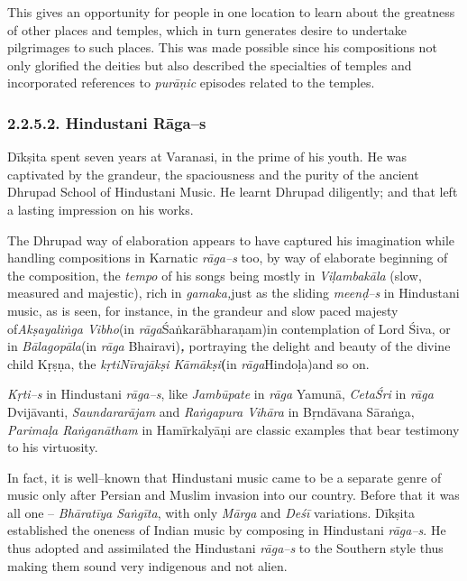 This gives an opportunity for people in one location to learn about the greatness of other places and temples, which in turn generates desire to undertake pilgrimages to such places. This was made possible since his compositions not only glorified the deities but also described the specialties of temples and incorporated references to \textit{purāṇic} episodes related to the temples.


\subsubsection*{2.2.5.2. Hindustani Rāga–s}

Dīkṣita spent seven years at Varanasi, in the prime of his youth. He was captivated by the grandeur, the spaciousness and the purity of the ancient Dhrupad School of Hindustani Music. He learnt Dhrupad diligently; and that left a lasting impression on his works.

The Dhrupad way of elaboration appears to have captured his imagination while handling compositions in Karnatic \textit{rāga–s} too, by way of elaborate beginning of the composition, the \textit{tempo} of his songs being mostly in \textit{Viḷambakāla} (slow, measured and majestic), rich in \textit{gamaka,}just as the sliding \textit{meenḍ–s} in Hindustani music, as is seen, for instance, in the grandeur and slow paced majesty of\textit{Akṣayaliṅga Vibho}(in \textit{rāga}Śaṅkarābharaṇam)in contemplation of Lord Śiva, or in \textit{Bālagopāla}(in \textit{rāga} Bhairavi)\textit{\textbf{, }}portraying the delight and beauty of the divine child Kṛṣṇa, the \textit{kṛtiNīrajākṣi Kāmākṣi}\textbf{(}in \textit{rāga}Hindoḷa)and so on.

\textit{Kṛti–s} in Hindustani \textit{rāga–s}, like \textit{Jambūpate} in \textit{rāga} Yamunā, \textit{CetaŚri} in \textit{rāga} Dvijāvanti, \textit{Saundararājam} and \textit{Raṅgapura Vihāra} in Bṛndāvana Sāraṅga, \textit{Parimaḷa Raṅganātham} in Hamīrkalyāṇi are classic examples that bear testimony to his virtuosity.

In fact, it is well–known that Hindustani music came to be a separate genre of music only after Persian and Muslim invasion into our country. Before that it was all one – \textit{Bhāratīya Saṅgīta}, with only \textit{Mārga} and \textit{Deśī} variations. Dīkṣita established the oneness of Indian music by composing in Hindustani \textit{rāga–s}. He thus adopted and assimilated the Hindustani \textit{rāga–s} to the Southern style thus making them sound very indigenous and not alien.


